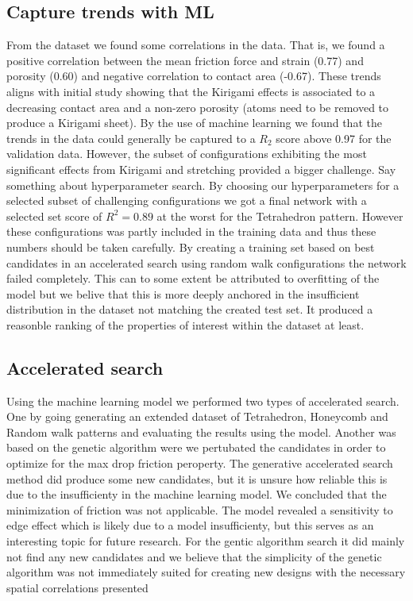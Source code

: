 \subsection{Capture trends with ML}
From the dataset we found some correlations in the data. That is, we found a
positive correlation between the mean friction force and strain (0.77) and
porosity (0.60) and negative correlation to contact area (-0.67). These trends
aligns with initial study showing that the Kirigami effects is associated to a
decreasing contact area and a non-zero porosity (atoms need to be removed to
produce a Kirigami sheet). By the use of machine learning we found that the
trends in the data could generally be captured to a $R_2$ score above 0.97 for
the validation data. However, the subset of configurations exhibiting the most
significant effects from Kirigami and stretching provided a bigger challenge.
Say something about hyperparameter search. By choosing our hyperparameters for a
selected subset of challenging configurations we got a final network with a
selected set score of $R^2 = 0.89$ at the worst for the Tetrahedron pattern.
However these configurations was partly included in the training data and thus these numbers should be taken carefully. By creating a training set based on best candidates in an accelerated search using random walk configurations the network failed completely. This can to some extent be attributed to overfitting of the model but we belive that this is more deeply anchored in the insufficient distribution in the dataset not matching the created test set. It produced a reasonble ranking of the properties of interest within the dataset at least.


\subsection{Accelerated search}
Using the machine learning model we performed two types of accelerated search. One by going generating an extended dataset of Tetrahedron, Honeycomb and Random walk patterns and evaluating the results using the model. Another was based on the genetic algorithm were we pertubated the candidates in order to optimize for the max drop friction peroperty. The generative accelerated search method did produce some new candidates, but it is unsure how reliable this is due to the insufficienty in the machine learning model. We concluded that the minimization of friction was not applicable. The model revealed a sensitivity to edge effect which is likely due to a model insufficienty, but this serves as an interesting topic for future research. For the gentic algorithm search it did mainly not find any new candidates and we believe that the simplicity of the genetic algorithm was not immediately suited for creating new designs with the necessary spatial correlations presented 



